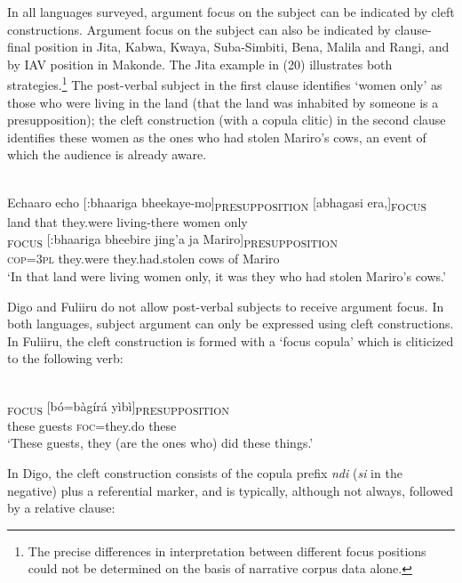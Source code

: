 \documentclass[output=paper]{langsci/langscibook}
\begin{document}
In all languages surveyed, argument focus on the subject can be indicated by cleft constructions. Argument focus on the subject can also be indicated by clause-final position in Jita, Kabwa, Kwaya, Suba-Simbiti, Bena, Malila and Rangi, and by IAV position in Makonde. The Jita example in (20) illustrates both strategies.\footnote{The precise differences in interpretation between different focus positions could not be determined on the basis of narrative corpus data alone.} The post-verbal subject in the first clause identifies ‘women only’ as those who were living in the land (that the land was inhabited by someone is a presupposition); the cleft construction (with a copula clitic) in the second clause identifies these women as the ones who had stolen Mariro’s cows, an event of which the audience is already aware.

\ea\label{ex:}
\\
\gll Echaaro echo [:bhaariga bheekaye-mo]\textsubscript{PRESUPPOSITION} [abhagasi era,]\textsubscript{FOCUS}\\
land that they.were living-there women only\\


\gll [ni=bho]\textsubscript{FOCUS} [:bhaariga bheebire jing’a ja Mariro]\textsubscript{PRESUPPOSITION}\\
\textsc{cop=3pl} they.were they.had.stolen cows of Mariro\\


\glt \textup{‘}\textup{In that land were living women only, it was they who had stolen Mariro’s cows.’}
\z

 Digo and Fuliiru do not allow post-verbal subjects to receive argument focus. In both languages, subject argument can only be expressed using cleft constructions. In Fuliiru, the cleft construction is formed with a ‘focus copula’ which is cliticized to the following verb:

\ea\label{ex:}
\\
\textsubscript{FOCUS} [bó=bàgírá yìbì]\textsubscript{PRESUPPOSITION}\\
these guests \textsc{foc}=they.do these\\


\glt \textup{‘}\textup{These guests, they (are the ones who) did these things.’}
\z

In Digo, the cleft construction consists of the copula prefix \textit{ndi} (\textit{si} in the negative) plus a referential marker, and is typically, although not always, followed by a relative clause:
\end{document}
